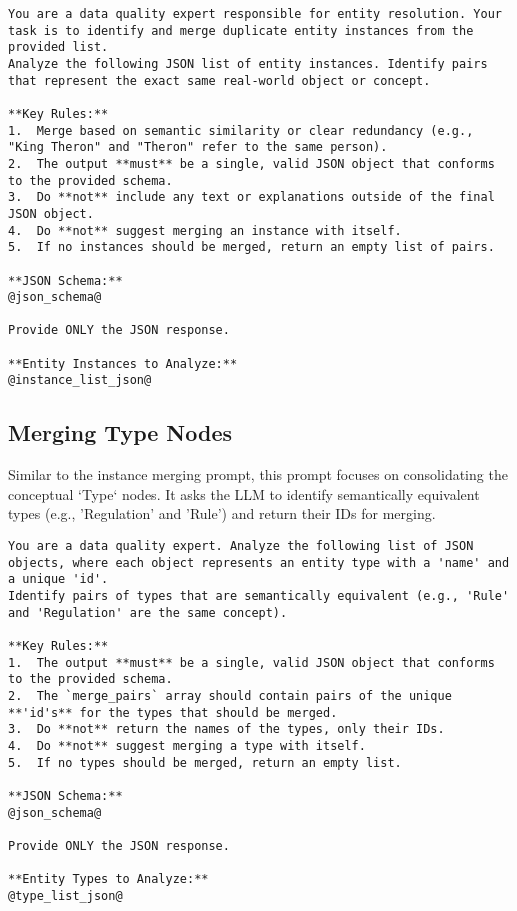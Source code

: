 \begin{lstlisting}[style=promptstyle, caption={Prompt for merging duplicate instance nodes.}, label={lst:prompt_merge_instance}]
You are a data quality expert responsible for entity resolution. Your task is to identify and merge duplicate entity instances from the provided list.
Analyze the following JSON list of entity instances. Identify pairs that represent the exact same real-world object or concept.

**Key Rules:**
1.  Merge based on semantic similarity or clear redundancy (e.g., "King Theron" and "Theron" refer to the same person).
2.  The output **must** be a single, valid JSON object that conforms to the provided schema.
3.  Do **not** include any text or explanations outside of the final JSON object.
4.  Do **not** suggest merging an instance with itself.
5.  If no instances should be merged, return an empty list of pairs.

**JSON Schema:**
@json_schema@

Provide ONLY the JSON response.

**Entity Instances to Analyze:**
@instance_list_json@
\end{lstlisting}

\subsection{Merging Type Nodes}
Similar to the instance merging prompt, this prompt focuses on consolidating the conceptual `Type` nodes. It asks the LLM to identify semantically equivalent types (e.g., 'Regulation' and 'Rule') and return their IDs for merging.

\begin{lstlisting}[style=promptstyle, caption={Prompt for merging duplicate type nodes.}, label={lst:prompt_merge_type}]
You are a data quality expert. Analyze the following list of JSON objects, where each object represents an entity type with a 'name' and a unique 'id'.
Identify pairs of types that are semantically equivalent (e.g., 'Rule' and 'Regulation' are the same concept).

**Key Rules:**
1.  The output **must** be a single, valid JSON object that conforms to the provided schema.
2.  The `merge_pairs` array should contain pairs of the unique **'id's** for the types that should be merged.
3.  Do **not** return the names of the types, only their IDs.
4.  Do **not** suggest merging a type with itself.
5.  If no types should be merged, return an empty list.

**JSON Schema:**
@json_schema@

Provide ONLY the JSON response.

**Entity Types to Analyze:**
@type_list_json@
\end{lstlisting}

